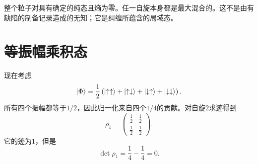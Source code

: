 整个粒子对具有确定的纯态且熵为零。任一自旋本身都是最大混合的。这不是由有缺陷的制备记录造成的无知；它是纠缠所蕴含的局域态。

\section{等振幅乘积态}

现在考虑
\begin{equation}
\left\lvert\Phi\right\rangle
=\frac12\left(
\left\lvert\uparrow\uparrow\right\rangle
+\left\lvert\uparrow\downarrow\right\rangle
+\left\lvert\downarrow\uparrow\right\rangle
+\left\lvert\downarrow\downarrow\right\rangle
\right).
\end{equation}
所有四个振幅都等于\(1/2\)，因此归一化来自四个\(1/4\)的贡献。对自旋\(2\)求迹得到
\begin{equation}
\rho_1
=
\begin{pmatrix}
\frac12&\frac12\\[2pt]
\frac12&\frac12
\end{pmatrix}.
\end{equation}
它的迹为\(1\)，但是
\begin{equation}
\det\rho_1
=\frac14-\frac14
=0.
\end{equation}

\begin{classroomqa}
\end{classroomqa}

\begin{classroomqa}
\end{classroomqa}

